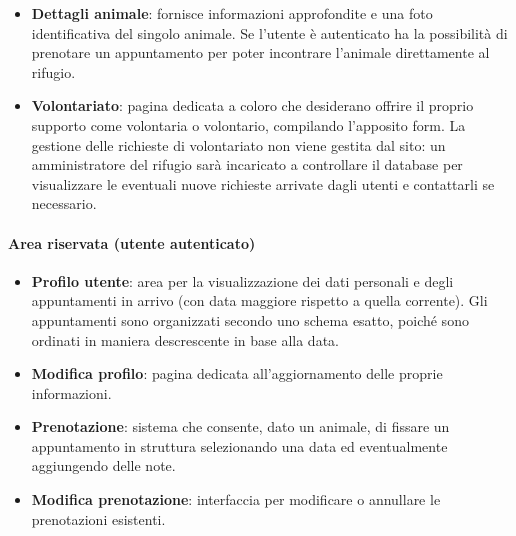 \documentclass[10pt, letterpaper]{article}
\begin{document}
\begin{itemize}
Lo schema ibrido è stato scelto perché combina i vantaggi di uno schema esatto, che garantisce coerenza e prevedibilità nella visualizzazione dell’elenco, con quelli di uno schema ambiguo, che supporta modalità di ricerca più flessibili. Trattandosi di un elenco di animali, nella maggior parte dei casi gli utenti non conoscono il nome dell’animale a priori e, di conseguenza, non effettuano una navigazione “a tiro perfetto". La navigazione si basa invece su caratteristiche generali quali specie, età, sesso o taglia, favorendo un'esplorazione più ampia degli animali disponibili.
Nel momento in cui un utente manifesta un forte interesse per un determinato animale del rifugio, ha la possibilità di prenotare un appuntamento e di visualizzarlo successivamente all'interno del proprio profilo.
    \item \textbf{Dettagli animale}: fornisce informazioni approfondite e una foto identificativa del singolo animale. Se l'utente è autenticato ha la possibilità di prenotare un appuntamento per poter incontrare l'animale direttamente al rifugio.
    \item \textbf{Volontariato}: pagina dedicata a coloro che desiderano offrire il proprio supporto come volontaria o volontario, compilando l'apposito form. La gestione delle richieste di volontariato non viene gestita dal sito: un amministratore del rifugio sarà incaricato a controllare il database per visualizzare le eventuali nuove richieste arrivate dagli utenti e contattarli se necessario.
\end{itemize}

\paragraph{Area riservata (utente autenticato)}
\begin{itemize}
    \item \textbf{Profilo utente}: area per la visualizzazione dei dati personali e degli appuntamenti in arrivo (con data maggiore rispetto a quella corrente). Gli appuntamenti sono organizzati secondo uno schema esatto, poiché sono ordinati in maniera descrescente in base alla data.
    \item \textbf{Modifica profilo}: pagina dedicata all’aggiornamento delle proprie informazioni.
    \item \textbf{Prenotazione}: sistema che consente, dato un animale, di fissare un appuntamento in struttura selezionando una data ed eventualmente aggiungendo delle note.
    \item \textbf{Modifica prenotazione}: interfaccia per modificare o annullare le prenotazioni esistenti.
\end{itemize}
\end{document}
